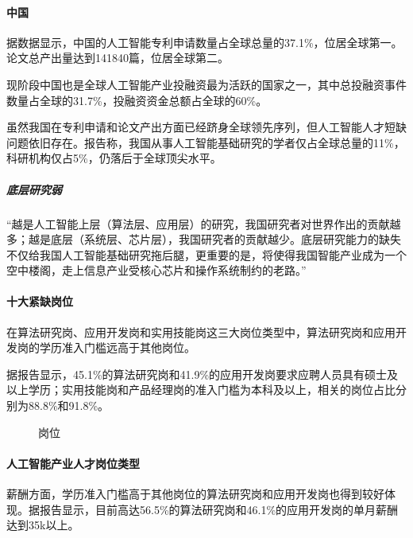 \documentclass[letterpaper,10pt,english]{sphinxmanual}
\begin{document}
\paragraph{中国}
\label{\detokenize{chapter_project/AI_talents:id3}}
据数据显示，中国的人工智能专利申请数量占全球总量的37.1\%，位居全球第一。论文总产出量达到141840篇，位居全球第二。

现阶段中国也是全球人工智能产业投融资最为活跃的国家之一，其中总投融资事件数量占全球的31.7\%，投融资资金总额占全球的60\%。

虽然我国在专利申请和论文产出方面已经跻身全球领先序列，但人工智能人才短缺问题依旧存在。报告称，我国从事人工智能基础研究的学者仅占全球总量的11\%，科研机构仅占5\%，仍落后于全球顶尖水平。%
\begin{footnote}[742]\sphinxAtStartFootnote
{}
%
\end{footnote}


\subparagraph{底层研究弱}
\label{\detokenize{chapter_project/AI_talents:id4}}
“越是人工智能上层（算法层、应用层）的研究，我国研究者对世界作出的贡献越多；越是底层（系统层、芯片层），我国研究者的贡献越少。底层研究能力的缺失不仅给我国人工智能基础研究拖后腿，更重要的是，将使得我国智能产业成为一个空中楼阁，走上信息产业受核心芯片和操作系统制约的老路。”


\paragraph{十大紧缺岗位}
\label{\detokenize{chapter_project/AI_talents:id5}}
在算法研究岗、应用开发岗和实用技能岗这三大岗位类型中，算法研究岗和应用开发岗的学历准入门槛远高于其他岗位。

据报告显示，45.1\%的算法研究岗和41.9\%的应用开发岗要求应聘人员具有硕士及以上学历；实用技能岗和产品经理岗的准入门槛为本科及以上，相关的岗位占比分别为88.8\%和91.8\%。

\begin{figure}[H]
\centering
\capstart

\noindent{}
\caption{岗位}\label{\detokenize{chapter_project/AI_talents:id19}}\end{figure}


\paragraph{人工智能产业人才岗位类型}
\label{\detokenize{chapter_project/AI_talents:id6}}
薪酬方面，学历准入门槛高于其他岗位的算法研究岗和应用开发岗也得到较好体现。据报告显示，目前高达56.5\%的算法研究岗和46.1\%的应用开发岗的单月薪酬达到35k以上。
\end{document}

